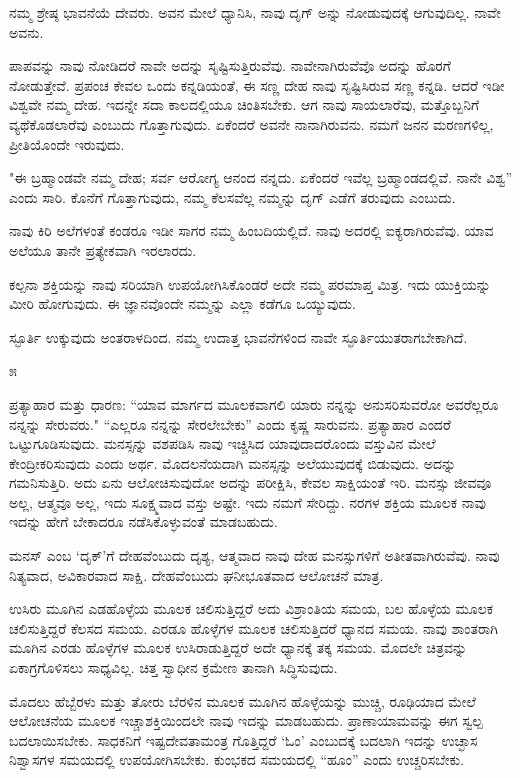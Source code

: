 ನಮ್ಮ ಶ್ರೇಷ್ಠ ಭಾವನೆಯೆ ದೇವರು. ಅವನ ಮೇಲೆ ಧ್ಯಾನಿಸಿ, ನಾವು ದೃಗ್ ಅನ್ನು ನೋಡುವುದಕ್ಕೆ ಆಗುವುದಿಲ್ಲ. ನಾವೇ ಅವನು.

ಪಾಪವನ್ನು ನಾವು ನೋಡಿದರೆ ನಾವೇ ಅದನ್ನು ಸೃಷ್ಟಿಸುತ್ತಿರುವೆವು. ನಾವೇನಾಗಿರುವೆವೊ ಅದನ್ನು ಹೊರಗೆ ನೋಡುತ್ತೇವೆ. ಪ್ರಪಂಚ ಕೇವಲ ಒಂದು ಕನ್ನಡಿಯಂತೆ, ಈ ಸಣ್ಣ ದೇಹ ನಾವು ಸೃಷ್ಟಿಸಿರುವ ಸಣ್ಣ ಕನ್ನಡಿ. ಆದರೆ ಇಡೀ ವಿಶ್ವವೇ ನಮ್ಮ ದೇಹ. ಇದನ್ನೇ ಸದಾ ಕಾಲದಲ್ಲಿಯೂ ಚಿಂತಿಸಬೇಕು. ಆಗ ನಾವು ಸಾಯಲಾರೆವು, ಮತ್ತೊಬ್ಬನಿಗೆ ವ್ಯಥೆಕೊಡಲಾರೆವು ಎಂಬುದು ಗೊತ್ತಾಗುವುದು. ಏಕೆಂದರೆ ಅವನೇ ನಾನಾಗಿರುವನು. ನಮಗೆ ಜನನ ಮರಣಗಳಿಲ್ಲ, ಪ್ರೀತಿಯೊಂದೇ ಇರುವುದು.

"ಈ ಬ್ರಹ್ಮಾಂಡವೇ ನಮ್ಮ ದೇಹ; ಸರ್ವ ಆರೋಗ್ಯ ಆನಂದ ನನ್ನದು. ಏಕೆಂದರೆ ಇವೆಲ್ಲ ಬ್ರಹ್ಮಾಂಡದಲ್ಲಿವೆ. ನಾನೇ ವಿಶ್ವ'' ಎಂದು ಸಾರಿ. ಕೊನೆಗೆ ಗೊತ್ತಾಗುವುದು, ನಮ್ಮ ಕೆಲಸವೆಲ್ಲ ನಮ್ಮನ್ನು ದೃಗ್ ಎಡೆಗೆ ತರುವುದು ಎಂಬುದು.

ನಾವು ಕಿರಿ ಅಲೆಗಳಂತೆ ಕಂಡರೂ ಇಡೀ ಸಾಗರ ನಮ್ಮ ಹಿಂಬದಿಯಲ್ಲಿದೆ. ನಾವು ಅದರಲ್ಲಿ ಐಕ್ಯರಾಗಿರುವೆವು. ಯಾವ ಅಲೆಯೂ ತಾನೇ ಪ್ರತ್ಯೇಕವಾಗಿ ಇರಲಾರದು.

ಕಲ್ಪನಾ ಶಕ್ತಿಯನ್ನು ನಾವು ಸರಿಯಾಗಿ ಉಪಯೋಗಿಸಿಕೊಂಡರೆ ಅದೇ ನಮ್ಮ ಪರಮಾಪ್ತ ಮಿತ್ರ. ಇದು ಯುಕ್ತಿಯನ್ನು ಮೀರಿ ಹೋಗುವುದು. ಈ ಜ್ಞಾನವೊಂದೇ ನಮ್ಮನ್ನು ಎಲ್ಲಾ ಕಡೆಗೂ ಒಯ್ಯುವುದು.

ಸ್ಫೂರ್ತಿ ಉಕ್ಕುವುದು ಅಂತರಾಳದಿಂದ. ನಮ್ಮ ಉದಾತ್ತ ಭಾವನೆಗಳಿಂದ ನಾವೇ ಸ್ಫೂರ್ತಿಯುತರಾಗಬೇಕಾಗಿದೆ.

\begin{center}
೫
\end{center}

ಪ್ರತ್ಯಾಹಾರ ಮತ್ತು ಧಾರಣ: “ಯಾವ ಮಾರ್ಗದ ಮೂಲಕವಾಗಲಿ ಯಾರು ನನ್ನನ್ನು ಅನುಸರಿಸುವರೋ ಅವರೆಲ್ಲರೂ ನನ್ನನ್ನು ಸೇರುವರು." “ಎಲ್ಲರೂ ನನ್ನನ್ನು ಸೇರಲೇಬೇಕು'' ಎಂದು ಕೃಷ್ಣ ಸಾರುವನು. ಪ್ರತ್ಯಾಹಾರ ಎಂದರೆ ಒಟ್ಟುಗೂಡಿಸುವುದು. ಮನಸ್ಸನ್ನು ವಶಪಡಿಸಿ ನಾವು ಇಚ್ಚಿಸಿದ ಯಾವುದಾದರೊಂದು ವಸ್ತುವಿನ ಮೇಲೆ ಕೇಂದ್ರೀಕರಿಸುವುದು ಎಂದು ಅರ್ಥ. ಮೊದಲನೆಯದಾಗಿ ಮನಸ್ಸನ್ನು ಅಲೆಯುವುದಕ್ಕೆ ಬಿಡುವುದು. ಅದನ್ನು ಗಮನಿಸುತ್ತಿರಿ. ಅದು ಏನು ಆಲೋಚಿಸುವುದೋ ಅದನ್ನು ಪರೀಕ್ಷಿಸಿ, ಕೇವಲ ಸಾಕ್ಷಿಯಂತೆ ಇರಿ. ಮನಸ್ಸು ಜೀವವೂ ಅಲ್ಲ, ಆತ್ಮವೂ ಅಲ್ಲ, ಇದು ಸೂಕ್ಷ್ಮವಾದ ವಸ್ತು ಅಷ್ಟೇ. ಇದು ನಮಗೆ ಸೇರಿದ್ದು. ನರಗಳ ಶಕ್ತಿಯ ಮೂಲಕ ನಾವು ಇದನ್ನು ಹೇಗೆ ಬೇಕಾದರೂ ನಡೆಸಿಕೊಳ್ಳುವಂತೆ ಮಾಡಬಹುದು.

ಮನಸ್ ಎಂಬ `ದೃಕ್'ಗೆ ದೇಹವೆಂಬುದು ದೃಶ್ಯ, ಆತ್ಮವಾದ ನಾವು ದೇಹ ಮನಸ್ಸುಗಳಿಗೆ ಅತೀತವಾಗಿರುವೆವು. ನಾವು ನಿತ್ಯವಾದ, ಅವಿಕಾರವಾದ ಸಾಕ್ಷಿ. ದೇಹವೆಂಬುದು ಘನೀಭೂತವಾದ ಆಲೋಚನೆ ಮಾತ್ರ.

ಉಸಿರು ಮೂಗಿನ ಎಡಹೊಳ್ಳೆಯ ಮೂಲಕ ಚಲಿಸುತ್ತಿದ್ದರೆ ಅದು ವಿಶ್ರಾಂತಿಯ ಸಮಯ, ಬಲ ಹೊಳ್ಳೆಯ ಮೂಲಕ ಚಲಿಸುತ್ತಿದ್ದರೆ ಕೆಲಸದ ಸಮಯ. ಎರಡೂ ಹೊಳ್ಳೆಗಳ ಮೂಲಕ ಚಲಿಸುತ್ತಿದರೆ ಧ್ಯಾನದ ಸಮಯ. ನಾವು ಶಾಂತರಾಗಿ ಮೂಗಿನ ಎರಡು ಹೊಳ್ಳೆಗಳ ಮೂಲಕ ಉಸಿರಾಡುತ್ತಿದ್ದರೆ ಅದೇ ಧ್ಯಾನಕ್ಕೆ ತಕ್ಕ ಸಮಯ. ಮೊದಲೇ ಚಿತ್ರವನ್ನು ಏಕಾಗ್ರಗೊಳಿಸಲು ಸಾಧ್ಯವಿಲ್ಲ. ಚಿತ್ತ ಸ್ವಾಧೀನ ಕ್ರಮೇಣ ತಾನಾಗಿ ಸಿದ್ಧಿಸುವುದು.

ಮೊದಲು ಹೆಬ್ಬೆರಳು ಮತ್ತು ತೋರು ಬೆರಳಿನ ಮೂಲಕ ಮೂಗಿನ ಹೊಳ್ಳೆಯನ್ನು ಮುಚ್ಚಿ, ರೂಢಿಯಾದ ಮೇಲೆ ಆಲೋಚನೆಯ ಮೂಲಕ ಇಚ್ಚಾಶಕ್ತಿಯಿಂದಲೇ ನಾವು ಇದನ್ನು ಮಾಡಬಹುದು. ಪ್ರಾಣಾಯಾಮವನ್ನು ಈಗ ಸ್ವಲ್ಪ ಬದಲಾಯಿಸಬೇಕು. ಸಾಧಕನಿಗೆ ಇಷ್ಟದೇವತಾಮಂತ್ರ ಗೊತ್ತಿದ್ದರೆ `ಓಂ' ಎಂಬುದಕ್ಕೆ ಬದಲಾಗಿ ಇದನ್ನು ಉಚ್ಛಾಸ ನಿಶ್ವಾಸಗಳ ಸಮಯದಲ್ಲಿ ಉಪಯೋಗಿಸಬೇಕು. ಕುಂಭಕದ ಸಮಯದಲ್ಲಿ “ಹೂಂ'' ಎಂದು ಉಚ್ಚರಿಸಬೇಕು.

